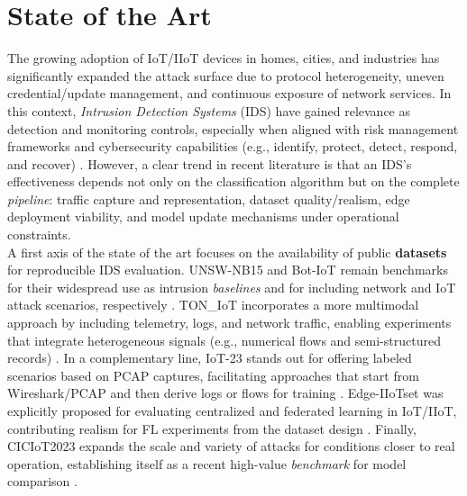 \section{State of the Art}
\label{sec:antecedentes}

The growing adoption of IoT/IIoT devices in homes, cities, and industries has significantly expanded the attack surface due to protocol heterogeneity, uneven credential/update management, and continuous exposure of network services. In this context, \textit{Intrusion Detection Systems} (IDS) have gained relevance as detection and monitoring controls, especially when aligned with risk management frameworks and cybersecurity capabilities (e.g., identify, protect, detect, respond, and recover) \cite{NIST_CSF2_2024}. However, a clear trend in recent literature is that an IDS's effectiveness depends not only on the classification algorithm but on the complete \textit{pipeline}: traffic capture and representation, dataset quality/realism, edge deployment viability, and model update mechanisms under operational constraints.\\

A first axis of the state of the art focuses on the availability of public \textbf{datasets} for reproducible IDS evaluation. UNSW-NB15 and Bot-IoT remain benchmarks for their widespread use as intrusion \textit{baselines} and for including network and IoT attack scenarios, respectively \cite{UNSW_UNSWNB15_Download, UNSW_BotIoT_Download}. TON\_IoT incorporates a more multimodal approach by including telemetry, logs, and network traffic, enabling experiments that integrate heterogeneous signals (e.g., numerical flows and semi-structured records) \cite{UNSW_TONIoT_Download, Moustafa2020_TONIoT}. In a complementary line, IoT-23 stands out for offering labeled scenarios based on PCAP captures, facilitating approaches that start from Wireshark/PCAP and then derive logs or flows for training \cite{Stratosphere_IoT23}. Edge-IIoTset was explicitly proposed for evaluating centralized and federated learning in IoT/IIoT, contributing realism for FL experiments from the dataset design \cite{Ferrag2022_EdgeIIoTset}. Finally, CICIoT2023 expands the scale and variety of attacks for conditions closer to real operation, establishing itself as a recent high-value \textit{benchmark} for model comparison \cite{Neto2023_CICIoT2023}.\\

